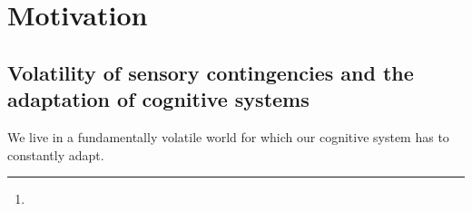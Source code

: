 \documentclass[12pt,english]{article}%
\title{\Title}%
\author{\AuthorA,
\AuthorB,
\AuthorC\thanks{\Address} }
\newcommand{\LP}[1]{\textbf{\textcolor{red}{[LP: #1]}}}
\newcommand{\AM}[1]{\textbf{\textcolor{blue}{[AM: #1]}}}
\begin{document}
%
\maketitle%
\begin{abstract}
\Abstract
\end{abstract}
\section{Motivation}
\label{sec:intro}
\subsection{Volatility of sensory contingencies and
the adaptation of cognitive systems}
We live in a fundamentally volatile world for which
our cognitive system has to constantly adapt.
\end{document}
